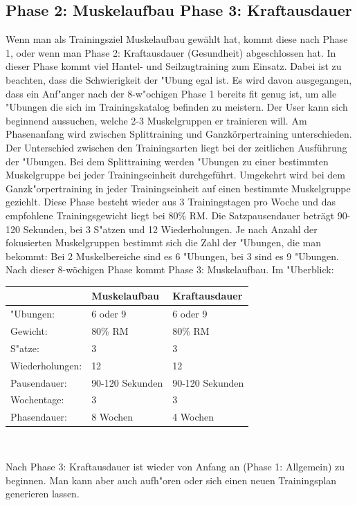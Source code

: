 \documentclass[FIPLY_base.tex]{subfiles}
\begin{document}
	\subsection{Phase 2: Muskelaufbau \newline Phase 3: Kraftausdauer}	
	Wenn man als Trainingsziel \grqq{}Muskelaufbau\grqq{} gewählt hat, kommt diese nach Phase 1, oder wenn man Phase 2: Kraftausdauer (Gesundheit) abgeschlossen hat. In dieser Phase kommt viel Hantel- und Seilzugtraining zum Einsatz. Dabei ist zu beachten, dass die Schwierigkeit der "Ubung egal ist. Es wird davon ausgegangen, dass ein Anf"anger nach der 8-w"ochigen Phase 1 bereits fit genug ist, um alle "Ubungen die sich im Trainingskatalog befinden zu meistern. 
	\newline
	Der User kann sich beginnend aussuchen, welche 2-3 Muskelgruppen er trainieren will. Am Phasenanfang wird zwischen Splittraining und Ganzkörpertraining unterschieden. Der Unterschied zwischen den Trainingsarten liegt bei der zeitlichen Ausführung der "Ubungen. Bei dem Splittraining werden "Ubungen zu einer bestimmten Muskelgruppe bei jeder Trainingseinheit durchgeführt. Umgekehrt wird bei dem Ganzk"orpertraining in jeder Trainingseinheit auf einen bestimmte Muskelgruppe geziehlt. 
	\newline
	Diese Phase besteht wieder aus 3 Trainingstagen pro Woche und das empfohlene Trainingsgewicht liegt bei 80\% RM. Die Satzpausendauer beträgt 90-120 Sekunden, bei 3 S"atzen und 12 Wiederholungen. Je nach Anzahl der fokusierten Muskelgruppen bestimmt sich die Zahl der "Ubungen, die man bekommt: Bei 2 Muskelbereiche sind es 6 "Ubungen, bei 3 sind es 9 "Ubungen. Nach dieser 8-wöchigen Phase kommt Phase 3: Muskelaufbau.
	\newline
	Im "Uberblick:
	\newline
	\begin{center}
		\begin{tabular}{| l || l | l |}
			\hline
			& Muskelaufbau & Kraftausdauer \\ \hline
			"Ubungen: & 6 oder 9 & 6 oder 9 \\ \hline 
			Gewicht: & 80\% RM & 80\% RM \\ \hline
			S"atze: & 3 & 3\\ \hline
			Wiederholungen: & 12 & 12\\ \hline
			Pausendauer: & 90-120 Sekunden & 90-120 Sekunden \\ \hline
			Wochentage: & 3 & 3\\ \hline
			Phasendauer: & 8 Wochen & 4 Wochen \\ \hline
		\end{tabular} \\
	\end{center}
	Nach Phase 3: Kraftausdauer ist wieder von Anfang an (Phase 1: Allgemein) zu beginnen. Man kann aber auch aufh"oren oder sich einen neuen Trainingsplan generieren lassen.
	
\end{document}
